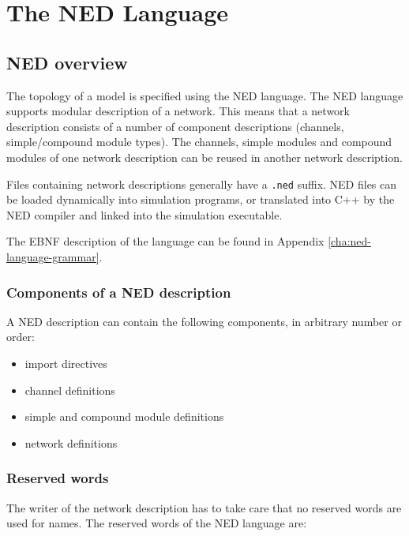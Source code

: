 \chapter{The NED Language}
\label{cha:the-ned-language}


\section{NED overview}

The topology of a model is specified using
the NED language.
The NED language supports modular
description of a network. This means that a network
description consists of a number of
component descriptions (channels,
simple/compound module
types). The channels, simple modules and compound
modules of one network description can be reused in another network
description.

Files containing network descriptions generally have a \texttt{.ned}
suffix. NED files can be loaded dynamically into simulation programs,
or translated into C++ by the NED compiler and linked into
the simulation executable.

The EBNF description of the language can be found in Appendix
\ref{cha:ned-language-grammar}.


\subsection{Components of a NED description}

A NED description can contain the following components, in arbitrary
number or order:
\begin{itemize}
  \item{import directives}
  \item{channel definitions}
  \item{simple and compound module definitions}
  \item{network definitions}
\end{itemize}


\subsection{Reserved words}

The writer of the network description has to take care that no
reserved words are used for names. The reserved words of the
NED language are:

